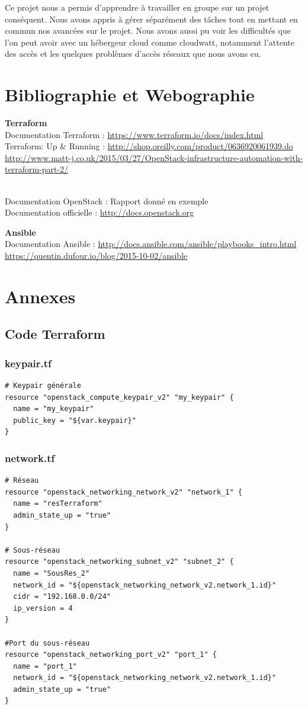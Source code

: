 \documentclass[]{article}
\begin{document}
Ce projet nous a permis d'apprendre à travailler en groupe sur un projet conséquent. Nous avons appris à gérer séparément des tâches tout en mettant en commun nos avancées sur le projet. Nous avons aussi pu voir les difficultés que l'on peut avoir avec un hébergeur cloud comme cloudwatt, notamment l'attente des accès et les quelques problèmes d'accès réseaux que nous avons eu.

\newpage
\section{Bibliographie et Webographie}
\textbf{Terraform}\\
Documentation Terraform : \url{https://www.terraform.io/docs/index.html} \\
Terraform: Up \& Running : \url{http://shop.oreilly.com/product/0636920061939.do } \\
\url{http://www.matt-j.co.uk/2015/03/27/OpenStack-infrastructure-automation-with-terraform-part-2/}

\textbf{}\\
Documentation OpenStack : Rapport donné en exemple \\
Documentation officielle : \url{http://docs.openstack.org}

\textbf{Ansible}\\
Documentation Ansible : \url{http://docs.ansible.com/ansible/playbooks_intro.html}\\
\url{https://quentin.dufour.io/blog/2015-10-02/ansible}

\newpage
\section{Annexes}
\subsection*{Code Terraform}
\subsubsection*{keypair.tf}
\begin{verbatim}
# Keypair générale
resource "openstack_compute_keypair_v2" "my_keypair" {
  name = "my_keypair"
  public_key = "${var.keypair}"
}
\end{verbatim}

\subsubsection*{network.tf}
\begin{verbatim}
# Réseau
resource "openstack_networking_network_v2" "network_1" {
  name = "resTerraform"
  admin_state_up = "true"
}

# Sous-réseau
resource "openstack_networking_subnet_v2" "subnet_2" {
  name = "SousRes_2"
  network_id = "${openstack_networking_network_v2.network_1.id}"
  cidr = "192.168.0.0/24"
  ip_version = 4 
}

#Port du sous-réseau
resource "openstack_networking_port_v2" "port_1" {
  name = "port_1"
  network_id = "${openstack_networking_network_v2.network_1.id}"
  admin_state_up = "true"
}
\end{verbatim}
\end{document}
